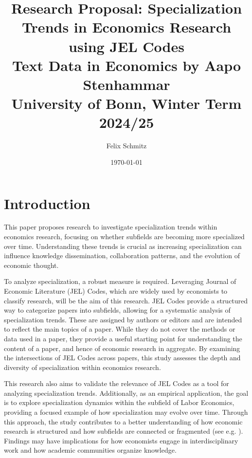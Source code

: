 \documentclass[11pt, a4paper, leqno]{article}
\begin{document}
\title{Research Proposal: Specialization Trends in Economics Research using JEL Codes \\
Text Data in Economics by Aapo Stenhammar \\
University of Bonn, Winter Term 2024/25}

\author{Felix Schmitz\footnotemark[1]}

\date{
    \today
}

\maketitle
{}

\section{Introduction}
This paper proposes research to investigate specialization trends within economics research, focusing on whether subfields are becoming more specialized over time.
Understanding these trends is crucial as increasing specialization can influence knowledge dissemination, collaboration patterns, and the evolution of economic thought.

To analyze specialization, a robust measure is required.
Leveraging Journal of Economic Literature (JEL) Codes, which are widely used by economists to classify research, will be the aim of this research.
JEL Codes provide a structured way to categorize papers into subfields, allowing for a systematic analysis of specialization trends.
These are assigned by authors or editors and are intended to reflect the main topics of a paper.
While they do not cover the methods or data used in a paper, they provide a useful starting point for understanding the content of a paper, and hence of economic research in aggregate.
By examining the intersections of JEL Codes across papers, this study assesses the depth and diversity of specialization within economics research.

This research also aims to validate the relevance of JEL Codes as a tool for analyzing specialization trends.
Additionally, as an empirical application, the goal is to explore specialization dynamics within the subfield of Labor Economics, providing a focused example of how specialization may evolve over time.
Through this approach, the study contributes to a better understanding of how economic research is structured and how subfields are connected or fragmented (see e.g. \citet{davis2019}).
Findings may have implications for how economists engage in interdisciplinary work and how academic communities organize knowledge.
\end{document}
